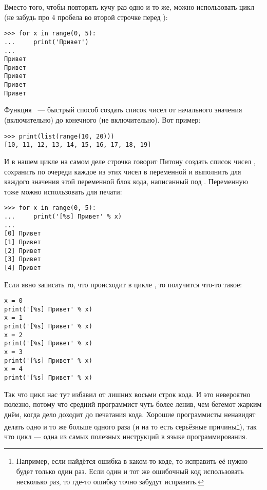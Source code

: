 Вместо того, чтобы повторять кучу раз одно и то же, можно использовать цикл  (не забудь про 4 пробела во второй строчке перед ):

\begin{verbatim}
>>> for x in range(0, 5):
...     print('Привет')
... 
Привет
Привет
Привет
Привет
Привет
\end{verbatim}

Функция  — быстрый способ создать список чисел от начального значения (включительно) до конечного (не включительно). Вот пример:

\begin{listing}
\begin{verbatim}
>>> print(list(range(10, 20)))
[10, 11, 12, 13, 14, 15, 16, 17, 18, 19]
\end{verbatim}
\end{listing}

И в нашем цикле  на самом деле строчка  говорит Питону создать список чисел \code{[0, 1, 2, 3, 4]}, сохранить по очереди каждое из этих чисел в переменной  и выполнить для каждого значения этой переменной блок кода, написанный под . Переменную  тоже можно использовать для печати:

\begin{listing}
\begin{verbatim}
>>> for x in range(0, 5):
...     print('[%s] Привет' % x)
...
[0] Привет
[1] Привет
[2] Привет
[3] Привет
[4] Привет
\end{verbatim}
\end{listing}

Если явно записать то, что происходит в цикле , то получится что-то такое:

\begin{listing}
\begin{verbatim}
x = 0
print('[%s] Привет' % x)
x = 1
print('[%s] Привет' % x)
x = 2
print('[%s] Привет' % x)
x = 3
print('[%s] Привет' % x)
x = 4
print('[%s] Привет' % x)
\end{verbatim}
\end{listing}

Так что цикл нас тут избавил от лишних восьми строк кода. И это невероятно полезно, потому что средний программист чуть более ленив, чем бегемот жарким днём, когда дело доходит до печатания кода. Хорошие программисты ненавидят делать одно и то же больше одного раза (и на то есть серьёзные причины\footnote{Например, если найдётся ошибка в каком-то коде, то исправить её нужно будет только один раз. Если один и тот же ошибочный код использовать несколько раз, то где-то ошибку точно забудут исправить.}), так что цикл — одна из самых полезных инструкций в языке программирования.

